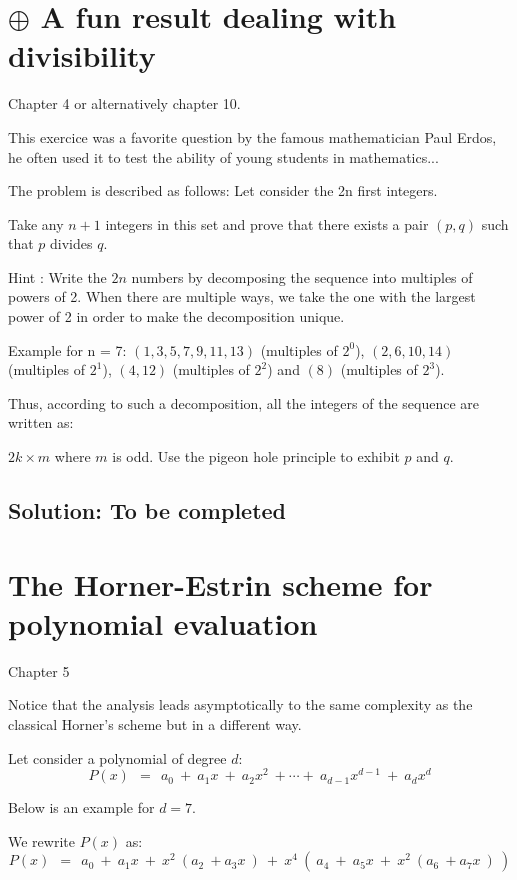 \documentclass{article}[12pt]
\begin{document}
\section{$\oplus$ A fun result dealing with divisibility}

Chapter 4 or alternatively chapter 10.

This exercice was a favorite question by the famous mathematician Paul Erdos, 
he often used it to test the ability of young students in mathematics...

The problem is described as follows: Let consider the 2n first integers.

Take any $n+1$ integers in this set and prove that there exists a pair $(p,q)$ such that $p$ divides $q$.
\smallskip

Hint : Write the $2n$ numbers by decomposing the sequence into multiples of powers of 2. 
When there are multiple ways, we take the one with the largest power of 2 in order to make the decomposition unique. 

Example for n = 7:
$(1, 3, 5, 7, 9, 11, 13)$ (multiples of $2^0$), 
$(2, 6, 10, 14)$ (multiples of $2^1$),
$(4, 12)$ (multiples of $2^2$) and $(8)$ (multiples of $2^3$).

Thus, according to such a decomposition, all the integers of the sequence are written as: 

$2k \times m$ where $m$ is odd.
Use the pigeon hole principle to exhibit $p$ and $q$.

\subsection{Solution: To be completed}


\section{The Horner-Estrin scheme for polynomial evaluation}

Chapter 5

Notice that the analysis leads asymptotically to the same complexity as the classical Horner's scheme but in a different way.
\bigskip

Let consider a polynomial of degree $d$:
\[
P(x) \ \ = \ \ a_0 \ + \ a_1 x \ + \ a_2 x^2 \ + \cdots + \ a_{d-1} x^{d-1} \ + \ a_d x^d
\]

Below is an example for $d=7$.

We rewrite $P(x)$ as:
\[
P(x) \ \ = \ \ a_0 \ + \ a_1 x \ + \ x^2 \ ( a_2  \ + a_3 x \ ) \ + 
\ x^4 \ ( \ a_4 \ + \ a_5 x \ + \ x^2 \ ( a_6  \ + a_7 x \ ) \ )
\]
\end{document}
